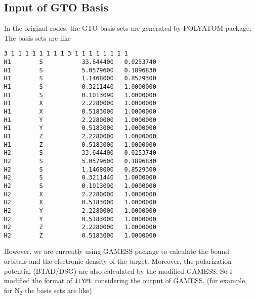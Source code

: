 \documentclass[aps,pra,groupedaddress,
                amsfonts,amssymb,
                preprint
    ]{revtex4}
\newcommand{\code}[1]{\texttt{#1}}
\begin{document}
\subsection{Input of GTO Basis}
\label{sec:input-gto-basis}
In the original codes, the GTO basis sets are generated by POLYATOM
package. The basis sets are like
\begin{verbatim}
3 1 1 1 1 1 1 1 1 3 1 1 1 1 1 1 1 1                    
H1        S           33.644400   0.0253740             
H1        S           5.0579600   0.1896830             
H1        S           1.1468000   0.8529300             
H1        S           0.3211440   1.0000000             
H1        S           0.1013090   1.0000000             
H1        X           2.2280000   1.0000000             
H1        X           0.5183000   1.0000000             
H1        Y           2.2280000   1.0000000             
H1        Y           0.5183000   1.0000000             
H1        Z           2.2280000   1.0000000             
H1        Z           0.5183000   1.0000000             
H2        S           33.644400   0.0253740             
H2        S           5.0579600   0.1896830             
H2        S           1.1468000   0.8529300             
H2        S           0.3211440   1.0000000             
H2        S           0.1013090   1.0000000             
H2        X           2.2280000   1.0000000             
H2        X           0.5183000   1.0000000             
H2        Y           2.2280000   1.0000000             
H2        Y           0.5183000   1.0000000             
H2        Z           2.2280000   1.0000000             
H2        Z           0.5183000   1.0000000
\end{verbatim}
However, we are currently using GAMESS package to calculate the bound
orbitals and the electronic density of the target. Moreover, the
polarization potential (BTAD/DSG) are also calculated by the modified
GAMESS. So I modified the format of \code{ITYPE} considering the output
of GAMESS, (for example, for N$_2$ the basis sets are like)
\end{document}
